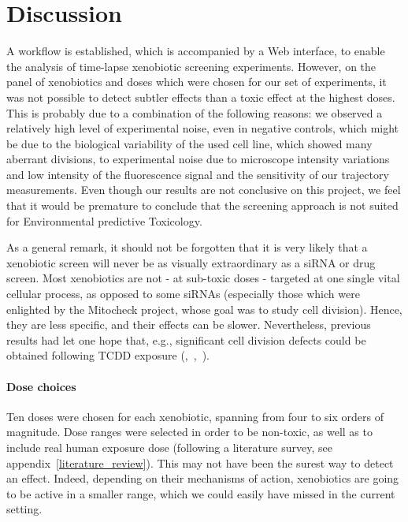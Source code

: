 \section{Discussion}

A workflow is established, which is accompanied by a Web interface, to
enable the analysis of time-lapse xenobiotic screening
experiments. However, on the panel of xenobiotics and doses which were
chosen for our set of experiments, it was not possible to detect
subtler effects than a toxic effect at the highest doses.
This is
probably due to a combination of the following reasons: we observed a
relatively high level of experimental noise, even in negative
controls, which might be due to the biological variability of the used
cell line, which showed many aberrant divisions, to experimental noise due to microscope intensity
variations and low intensity of the fluorescence signal and the sensitivity of our
trajectory measurements. Even though our results are not conclusive on
this project, we feel that it would be premature to conclude that the screening approach
is not suited for Environmental predictive Toxicology. 

As a general remark, it should not be forgotten that it is very likely that a xenobiotic screen will never be as visually extraordinary as a siRNA or drug screen. Most xenobiotics are not - at sub-toxic doses - targeted at one single vital cellular process, as opposed to some siRNAs (especially those which were enlighted by the Mitocheck project, whose goal was to study cell division). Hence, they are less specific, and their effects can be slower. Nevertheless, previous results had let one hope that, e.g., significant cell division defects could be obtained following TCDD exposure (\cite{pmid20089886},~\cite{pmid18640100},~\cite{pmid11479202}).

\paragraph{Dose choices\\}
Ten doses were chosen for each xenobiotic, spanning from four to six orders of magnitude. Dose ranges were selected in order to be non-toxic, as well as to include real human exposure dose (following a literature survey, see appendix~\ref{literature_review}). This may not have been the surest way to detect an effect. Indeed, depending on their mechanisms of action, xenobiotics are going to be active in a smaller range, which we could easily have missed in the current setting.

